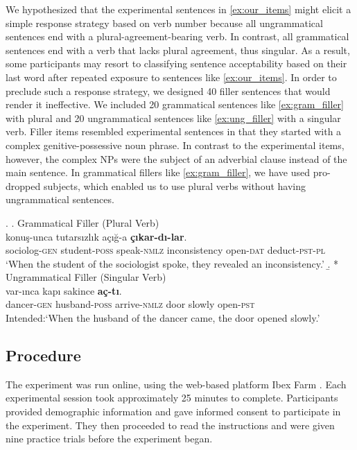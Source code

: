 \documentclass[apacite,linguex]{glossa}\usepackage[]{graphicx}\usepackage[]{color}
\begin{document}
We hypothesized that the experimental sentences in \ref{ex:our_items} might elicit a simple response strategy based on verb number because all ungrammatical sentences end with a plural-agreement-bearing verb. In contrast, all grammatical sentences end with a verb that lacks plural agreement, thus singular. As a result, some participants may resort to classifying sentence acceptability based on their last word after repeated exposure to sentences like \ref{ex:our_items}. In order to preclude such a response strategy, we designed 40 filler sentences that would render it ineffective. We included 20 grammatical sentences like \ref{ex:gram_filler} with plural and 20 ungrammatical sentences like \ref{ex:ung_filler} with a singular verb. Filler items resembled experimental sentences in that they started with a complex genitive-possessive noun phrase. In contrast to the experimental items, however, the complex NPs were the subject of an adverbial clause instead of the main sentence. In grammatical fillers like \ref{ex:gram_filler}, we have used pro-dropped subjects, which enabled us to use plural verbs without having ungrammatical sentences. 


\ex. \label{ex:fillers}
  \a. Grammatical Filler (Plural Verb) \label{ex:gram_filler}\\
   konu\c{s}-unca tutars{\i}zl{\i}k a\c{c}{\i}\u{g}-a \textbf{\c{c}{\i}kar-d{\i}-lar}.\\ 
  sociolog-\textsc{gen}  student-\textsc{poss} speak-\textsc{nmlz} inconsistency  open-\textsc{dat} deduct-\textsc{pst}-\textsc{pl}\\
  \glt `When the student of the sociologist spoke, they revealed an inconsistency.'
  \b. * Ungrammatical Filler (Singular Verb) \label{ex:ung_filler}\\
   var-{\i}nca kap{\i} sakince \textbf{a\c{c}-t{\i}}. \\
  dancer-\textsc{gen}  husband-\textsc{poss} arrive-\textsc{nmlz} door slowly  open-\textsc{pst}\\
  \glt Intended:`When the husband of the dancer came, the door opened slowly.'


\subsection{Procedure}

The experiment was run online, using the web-based platform Ibex Farm \citep{Drummond2013}. Each experimental session took approximately 25 minutes to complete. Participants provided demographic information and gave informed consent to participate in the experiment. They then proceeded to read the instructions and were given nine practice trials before the experiment began.
\end{document}
